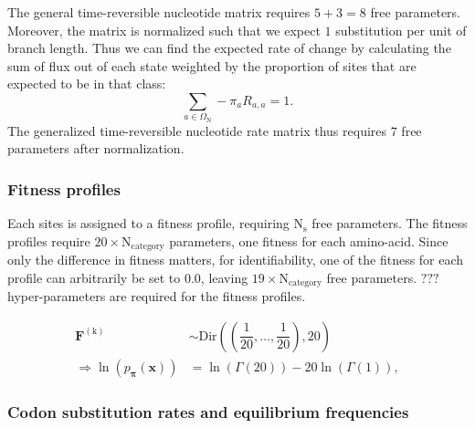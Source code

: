 \documentclass{article}
\newcommand{\SetNuc}{\Omega_{\mathrm{N}}}
\newcommand{\mutmatrix}{R}
\newcommand{\mutequi}{\pi}
\newcommand{\Mutequi}{\bm{\mutequi}}
\newcommand{\scaledfit}{F}
\newcommand{\ScaledFit}{\bm{\scaledfit}}
\newcommand{\site}{\text{s}}
\newcommand{\Nsite}{\text{N}_{\site}}
\newcommand{\cat}{\text{k}}
\newcommand{\catexp}{^{(\cat)}}
\begin{document}
The general time-reversible nucleotide matrix requires $5+3 = 8$ free parameters. Moreover, the matrix is normalized such that we expect $1$ substitution per unit of branch length. Thus we can find the expected rate of change by calculating the sum of flux out of each state weighted by the proportion of sites that are expected to be in that class:
\begin{equation}
\sum_{a \in \SetNuc} - \mutequi_a \mutmatrix_{a,a} = 1.
\end{equation}
The generalized time-reversible nucleotide rate matrix thus requires $7$ free parameters after normalization.

\subsubsection{Fitness profiles}

Each sites is assigned to a fitness profile, requiring $\Nsite$ free parameters.
The fitness profiles require $20 \times \text{N}_{\text{category}} $ parameters, one fitness for each amino-acid.
Since only the difference in fitness matters, for identifiability, one of the fitness for each profile can arbitrarily be set to $0.0$, leaving $19 \times \text{N}_{\text{category}} $ free parameters.
$???$ hyper-parameters are required for the fitness profiles.

\begin{align}
\ScaledFit\catexp & \sim \mathrm{Dir}\left( \left( \dfrac{1}{20}, \hdots , \dfrac{1}{20} \right) , 20\right) \\
\Rightarrow \ln \left(p_{\Mutequi}\left(\bm{x}\right)\right) & = \ln \left(\Gamma(20)\right) - 20\ln\left(\Gamma(1)\right), 
\end{align}


\subsubsection{Codon substitution rates and equilibrium frequencies}
\end{document}
